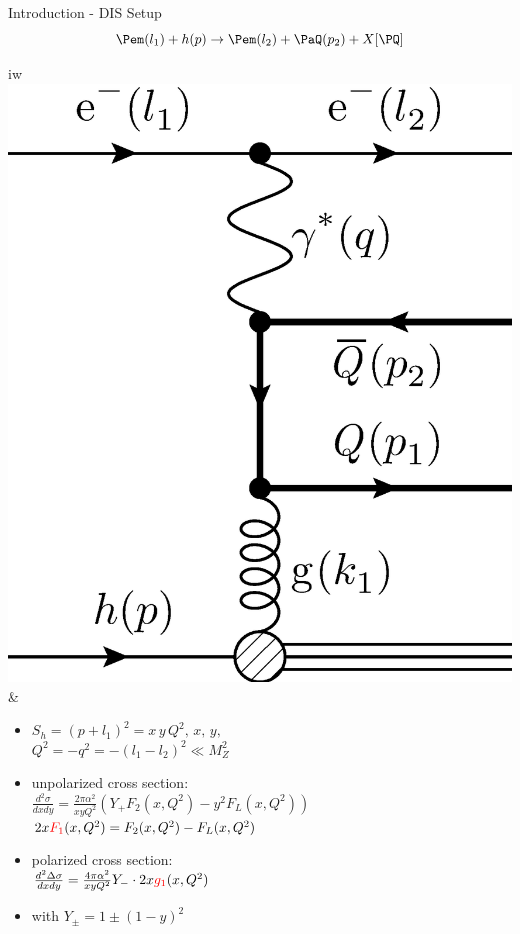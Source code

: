 \begin{frame}{Introduction - DIS Setup}
\[\Pem(l_1)+h(p) \to \Pem(l_2) + \PaQ(p_2) + X[\PQ]\]
\hspace{-.5cm}\begin{tabular}{iw}
\includegraphics[width=.25\textwidth]{img/DIS.eps} &
\begin{itemize}
\item $S_h = (p+l_1)^2 = x\,y\,Q^2,\,x,\,y,$\\
$Q^2 = -q^2 = - (l_1-l_2)^2 \ll M_Z^2$
\item unpolarized cross section: \\
$\frac{d^2\sigma}{dx dy} = \frac{2\pi \alpha^2}{x y Q^2}\left(Y_+F_2(x,Q^2) - y^2F_L(x,Q^2)\right)$\\
$2x{\color{red}F_1}(x,Q^2) = F_2(x,Q^2) - F_L(x,Q^2)$
\item polarized cross section: \\
$\frac{d^2\Delta\sigma}{dx dy} = \frac{4\pi \alpha^2}{x y Q^2}Y_-\cdot 2x{\color{red}g_1}(x,Q^2)$
\item with $Y_\pm = 1 \pm (1-y)^2$
\end{itemize}
\end{tabular}
\end{frame}

